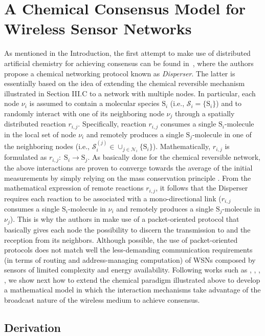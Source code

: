 \documentclass[journal]{IEEEtran}
\newcommand{\mol}[1]{\ensuremath{\textrm{#1}}}
\begin{document}
{\section{A Chemical Consensus Model for \newline Wireless Sensor Networks}\label{sec:WSN_CNP}
As mentioned in the Introduction, the first attempt to make use of distributed artificial chemistry for achieving consensus can be found in~\cite{MeTh}, where the authors propose a chemical networking protocol known as \emph{Disperser}. {The latter is essentially based on the idea of extending the chemical reversible mechanism illustrated in Section III.C to a network with multiple nodes. In particular, each node $\nu_i$ is assumed to contain a molecular species $\mol{S}_{i}$ (i.e., $\mathcal S_i = \{\mol{S}_i\}$) and to randomly interact with one of its neighboring node $\nu_j$ through a spatially distributed reaction $r_{i,j}$. Specifically, reaction $r_{i,j}$ consumes a single $\mol{S}_i$-molecule in the local set of node $\nu_i$ and remotely produces a single $\textrm {S}_j$-molecule in one of the neighboring nodes (i.e., $\mathcal{S}_i^{(j)} \in \cup_{j\in \mathcal{N}_i}\{\mol{S}_i\}$). Mathematically, $r_{i,j}$ is formulated as $r_{i,j}: \; \mol{S}_{i} \to \mol{S}_{j}$.
As basically done for the chemical reversible network, the above interactions are proven to converge towards the average of the initial measurements by simply relying on the mass conservation principle \cite{MeTh}.} 
{From the mathematical expression of remote reactions $r_{i,j}$, it follows that the Disperser} requires each reaction to be associated with a mono-directional link ($r_{i,j}$ consumes a single $\mol{S}_i$-molecule in $\nu_i$ and remotely produces a single $\textrm {S}_j$-molecule in $\nu_j$). This is why the authors in \cite{MeTh} make use of a packet-oriented protocol that basically gives each node the possibility to discern the transmission to and the reception from its neighbors. {Although possible, the use of packet-oriented protocols does not match well the less-demanding communication requirements (in terms of routing and address-managing computation) of WSNs composed by sensors of limited complexity and energy availability.
Following works such as \cite{AyYi09}, \cite{FrGi11}, \cite{NoBa11}, \cite{NaDi11}, we
show next how {to extend the chemical paradigm illustrated above to develop a mathematical model in which the interaction mechanisms take advantage of the broadcast nature of the wireless medium to achieve consensus.}}}
\subsection{Derivation}
\end{document}
